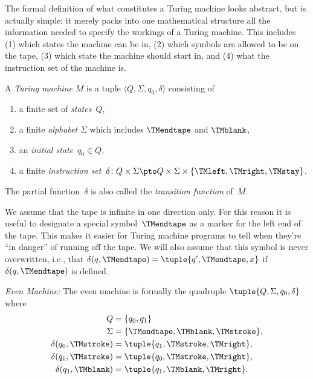 \documentclass[../../../include/open-logic-section]{subfiles}
\begin{document}

\begin{explain}
The formal definition of what constitutes a Turing machine looks
abstract, but is actually simple: it merely packs into one
mathematical structure all the information needed to specify the
workings of a Turing machine. This includes (1) which states the
machine can be in, (2) which symbols are allowed to be on the tape, (3)
which state the machine should start in, and (4) what the instruction
set of the machine is.
\end{explain}

\begin{defn}
A \emph{Turing machine} $M$ is a tuple $\langle Q, \Sigma, q_0,
\delta\rangle$ consisting of
\begin{enumerate}
\item a finite set of \emph{states}~$Q$,
\item a finite \emph{alphabet} $\Sigma$ which includes $\TMendtape$ and
  $\TMblank$,
\item an \emph{initial state}~$q_0 \in Q$,
\item a finite \emph{instruction set}~$\delta\colon Q \times \Sigma
  \pto Q \times \Sigma \times \{\TMleft, \TMright, \TMstay\}$.
\end{enumerate}
The partial function~$\delta$ is also called the \emph{transition function}
of~$M$.
\end{defn}

\begin{explain}
We assume that the tape is infinite in one direction only. For this
reason it is useful to designate a special symbol~$\TMendtape$ as
a marker for the left end of the tape. This makes it easier for
Turing machine programs to tell when they're ``in danger'' of running
off the tape. We will also assume that this symbol is never overwritten,
i.e., that $\delta(q,\TMendtape) = \tuple{q', \TMendtape, x}$ if
$\delta(q,\TMendtape)$ is defined.
\end{explain}

\begin{ex}
\emph{Even Machine:} The even machine is formally
the quadruple $\tuple{Q, \Sigma, q_0, \delta}$ where
\begin{align*}
Q & = \{ q_0, q_1 \} \\
\Sigma & = \{ \TMendtape, \TMblank, \TMstroke \}, \\
\delta(q_0, \TMstroke) & = \tuple{q_1, \TMstroke, \TMright},\\
\delta(q_1, \TMstroke) & = \tuple{q_0, \TMstroke, \TMright},\\
\delta(q_1, \TMblank)  & = \tuple{q_1, \TMblank, \TMright}.
\end{align*}
\end{ex}
\end{document}
